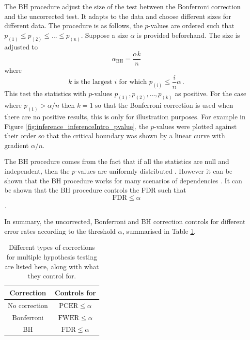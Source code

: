 The BH procedure adjust the size of the test between the Bonferroni correction and the uncorrected test. It adapts to the data and choose different sizes for different data. The procedure is as follows, the $p$-values are ordered such that $p_{(1)}\leqslant p_{(2)}\leqslant \dotsc \leqslant p_{(n)}$. Suppose a size $\alpha$ is provided beforehand. The size is adjusted to
\begin{equation}
  \alpha_{\text{BH}} = \frac{\alpha k}{n}
\end{equation}
where
\begin{equation}
  k\text{ is the largest }i\text{ for which }p_{(i)}\leqslant\frac{i}{n}\alpha
  \ .
\end{equation}
This test the statistics with $p$-values $p_{(1)},p_{(2)},\dotsc,p_{(k)}$ as positive. For the case where $p_{(1)}>\alpha/n$ then $k=1$ so that the Bonferroni correction is used when there are no positive results, this is only for illustration purposes. For example in Figure \ref{fig:inference_inferenceIntro_pvalue}, the $p$-values were plotted against their order so that the critical boundary was shown by a linear curve with gradient $\alpha/n$.

The BH procedure comes from the fact that if all the statistics are null and independent, then the $p$-values are uniformly distributed \citep{simes1986improved}. However it can be shown that the BH procedure works for many scenarios of dependencies \citep{benjamini2001control}. It can be shown that the BH procedure controls the FDR such that
\begin{equation}
  \text{FDR}\leqslant\alpha
\end{equation}
\citep{benjamini1995controlling}.

In summary, the uncorrected, Bonferroni and BH correction controls for different error rates according to the threshold $\alpha$, summarised in Table \ref{table:inference_corrections}.

\begin{table}
    \centering
    \begin{tabular}{c|c}
        Correction&Controls for\\\hline
        No correction&$\text{PCER}\leqslant\alpha$\\
        Bonferroni&$\text{FWER}\leqslant\alpha$\\
        BH&$\text{FDR}\leqslant\alpha$
    \end{tabular}
    \caption{Different types of corrections for multiple hypothesis testing are listed here, along with what they control for.}
    \label{table:inference_corrections}
\end{table}


